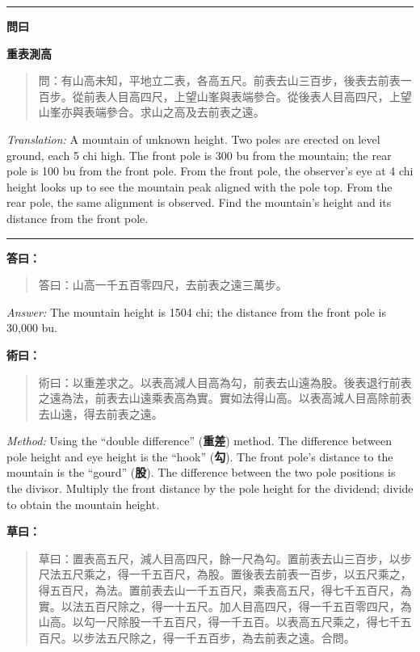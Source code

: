 \documentclass[11pt,a4paper]{article}
\newenvironment{problem}[1][]{%
  \medskip\noindent\rule{\textwidth}{0.4pt}%
  \par\noindent\textbf{\color{sectioncolor}#1}\par\nopagebreak%
  \smallskip%
}{%
  \par\noindent\rule{\textwidth}{0.4pt}\medskip%
}
\newenvironment{answer}{%
  \medskip\noindent{\color{answercolor}\rule{0.5\textwidth}{0.5pt}}%
  \par\color{answercolor}%
}{%
  \par\medskip%
}
\newenvironment{method}{%
  \medskip\noindent{\color{methodcolor}\rule{0.5\textwidth}{0.5pt}}%
  \par\color{methodcolor}%
}{%
  \par\medskip%
}
\begin{document}
\begin{problem}[\textbf{問曰}]
\textbf{\color{sectioncolor}重表測高}

\begin{quote}
\textcolor{chinacolor}{%
問：有山高未知，平地立二表，各高五尺。前表去山三百步，後表去前表一百步。從前表人目高四尺，上望山峯與表端參合。從後表人目高四尺，上望山峯亦與表端參合。求山之高及去前表之遠。
}
\end{quote}

\textit{Translation:} A mountain of unknown height. Two poles are erected 
on level ground, each 5 chi high. The front pole is 300 bu from the 
mountain; the rear pole is 100 bu from the front pole. From the front 
pole, the observer's eye at 4 chi height looks up to see the mountain 
peak aligned with the pole top. From the rear pole, the same alignment 
is observed. Find the mountain's height and its distance from the front 
pole.
\end{problem}

\begin{answer}
\textbf{答曰：}

\begin{quote}
\textcolor{chinacolor}{%
答曰：山高一千五百零四尺，去前表之遠三萬步。
}
\end{quote}

\textit{Answer:} The mountain height is 1504 chi; the distance from the 
front pole is 30,000 bu.
\end{answer}

\begin{method}
\textbf{術曰：}

\begin{quote}
\textcolor{chinacolor}{%
術曰：以重差求之。以表高減人目高為勾，前表去山遠為股。後表退行前表之遠為法，前表去山遠乘表高為實。實如法得山高。以表高減人目高除前表去山遠，得去前表之遠。
}
\end{quote}

\textit{Method:} Using the ``double difference'' (\textbf{重差}) method. 
The difference between pole height and eye height is the ``hook'' (\textbf{勾}). 
The front pole's distance to the mountain is the ``gourd'' (\textbf{股}). 
The difference between the two pole positions is the divisor. Multiply 
the front distance by the pole height for the dividend; divide to obtain 
the mountain height.
\end{method}

\noindent\textbf{草曰：}
\begin{quote}
\textcolor{chinacolor}{%
草曰：置表高五尺，減人目高四尺，餘一尺為勾。置前表去山三百步，以步尺法五尺乘之，得一千五百尺，為股。置後表去前表一百步，以五尺乘之，得五百尺，為法。置前表去山一千五百尺，乘表高五尺，得七千五百尺，為實。以法五百尺除之，得一十五尺。加人目高四尺，得一千五百零四尺，為山高。以勾一尺除股一千五百尺，得一千五百。以表高五尺乘之，得七千五百尺。以步法五尺除之，得一千五百步，為去前表之遠。合問。
}
\end{quote}
\end{document}
